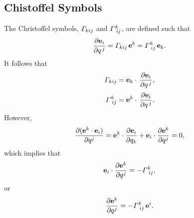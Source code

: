 \documentclass[12pt,prb,aps,notitlepage]{revtex4-1}
\begin{document}
\subsection{Chistoffel Symbols}
The Christoffel symbols, ${\mit\Gamma}_{kij}$ and ${\mit\Gamma}^k_{\,\,ij}$, are defined such that 
\begin{equation}\label{e25}
\frac{\partial {\bf e}_i}{\partial q^{\,j}} = {\mit\Gamma}_{kij}\,{\bf e}^k= {\mit\Gamma}^k_{\,\,ij}\,{\bf e}_k.
\end{equation}
It follows that 
\begin{align}\label{e33x}
{\mit\Gamma}_{kij} &= {\bf e}_k\cdot\,\frac{\partial {\bf e}_i}{\partial q^{\,j}},\\[0.5ex]
{\mit\Gamma}^k_{\,\,ij} &= {\bf e}^k\cdot\,\frac{\partial {\bf e}_i}{\partial q^{\,j}}.\label{e34x}
\end{align}
However,
\begin{equation}
\frac{\partial ({\bf e}^k\cdot{\bf e}_i)}{\partial q^j} ={\bf e}^k \cdot\frac{\partial {\bf e}_i}{\partial q_k} + {\bf e}_i\cdot\frac{\partial{\bf e}^k}{\partial q^j}
= 0,
\end{equation}
which implies that
\begin{equation}\label{e27}
{\bf e}_i\cdot\frac{\partial{\bf e}^k}{\partial q^j}= - {\mit\Gamma}^k_{\,\,ij},
\end{equation}
or
\begin{equation}\label{e27a}
\frac{\partial{\bf e}^k}{\partial q^j}= - {\mit\Gamma}^k_{\,\,ij}\,{\bf e}^i.
\end{equation}
\end{document}
